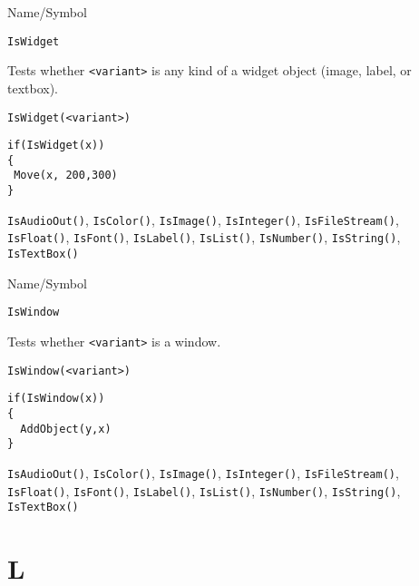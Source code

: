 \begin{desc}{Name/Symbol}
\item[Name/Symbol]	\verb+IsWidget+

\item[Description]	Tests whether \verb+<variant>+ is any kind of a widget object
		(image, label, or textbox).

\item[Usage]		
\begin{verbatim}
IsWidget(<variant>)
\end{verbatim}

\item[Example]	
\begin{verbatim}
if(IsWidget(x))
{
 Move(x, 200,300)
}
\end{verbatim}

\item[See Also] \verb+IsAudioOut()+, \verb+IsColor()+,
  \verb+IsImage()+, \verb+IsInteger()+, \verb+IsFileStream()+,
  \verb+IsFloat()+, \verb+IsFont()+, \verb+IsLabel()+,
  \verb+IsList()+, \verb+IsNumber()+, \verb+IsString()+,
  \verb+IsTextBox()+
\end{desc}
\rl

\begin{desc}{Name/Symbol}
\item[Name/Symbol]	\verb+IsWindow+

\item[Description]	Tests whether \verb+<variant>+ is a window.

\item[Usage]		
\begin{verbatim}
IsWindow(<variant>)
\end{verbatim}

\item[Example]	
\begin{verbatim}
if(IsWindow(x))
{
  AddObject(y,x)
}
\end{verbatim}

\item[See Also] \verb+IsAudioOut()+, \verb+IsColor()+,
  \verb+IsImage()+, \verb+IsInteger()+, \verb+IsFileStream()+,
  \verb+IsFloat()+, \verb+IsFont()+, \verb+IsLabel()+,
  \verb+IsList()+, \verb+IsNumber()+, \verb+IsString()+,
  \verb+IsTextBox()+
\end{desc}

\rl




\section{L}
\rl

